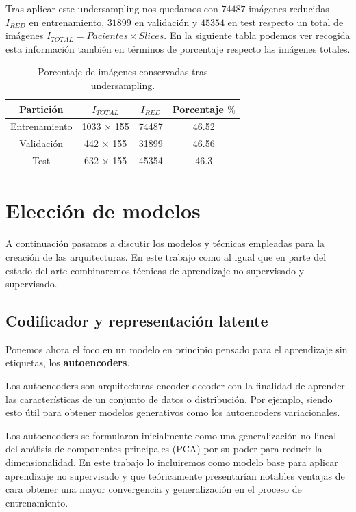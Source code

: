 Tras aplicar este undersampling nos quedamos con $74487$ imágenes reducidas $I_{RED}$ en entrenamiento, $31899$ en validación y $45354$ en test respecto un total de imágenes $I_{TOTAL} = Pacientes \times Slices$. En la siguiente tabla podemos ver recogida esta información también en términos de porcentaje respecto las imágenes totales.

\begin{table}[H]
	\centering
	\begin{tabular}{cccc}
		\hline
		\toprule
		\textbf{Partición} & \textbf{$I_{TOTAL}$} & \textbf{$I_{RED}$} & \textbf{Porcentaje $\%$} \\ 
		\midrule
		Entrenamiento & 1033 $\times$ 155 & 74487 &  46.52 \\ 
		Validación & 442 $\times$ 155 & 31899 & 46.56 \\ 
		Test & 632 $\times$ 155 & 45354 &  46.3\\ 
		\bottomrule
	\end{tabular}
	\caption{Porcentaje de imágenes conservadas tras undersampling.}
\end{table}


\section{Elección de modelos}

A continuación pasamos a discutir los modelos y técnicas empleadas para la creación de las arquitecturas. En este trabajo como al igual que en parte del estado del arte combinaremos técnicas de aprendizaje no supervisado y supervisado.

\subsection{Codificador y representación latente}

Ponemos ahora el foco en un modelo en principio pensado para el aprendizaje sin etiquetas, los \textbf{autoencoders}.

Los autoencoders son arquitecturas encoder-decoder con la finalidad de aprender las características de un conjunto de datos o distribución. Por ejemplo, siendo esto útil para obtener modelos generativos como los autoencoders variacionales. 

Los autoencoders se formularon inicialmente como una generalización no lineal del análisis de componentes principales (PCA) por su poder para reducir la dimensionalidad. En este trabajo lo incluiremos como modelo base para aplicar aprendizaje no supervisado y que teóricamente presentarían notables ventajas de cara obtener una mayor convergencia y generalización en el proceso de entrenamiento. 

